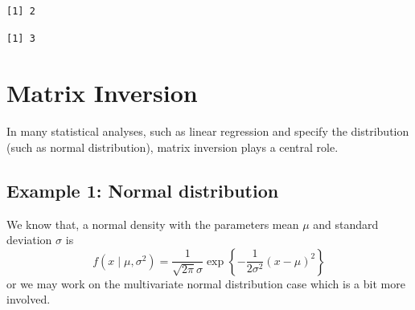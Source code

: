 \documentclass[
  letterpaper,
  DIV=11,
  numbers=noendperiod]{scrreprt}
\newenvironment{Shaded}{\begin{snugshade}}{\end{snugshade}}
\newcommand{\AttributeTok}[1]{\textcolor[rgb]{0.40,0.45,0.13}{#1}}
\newcommand{\ConstantTok}[1]{\textcolor[rgb]{0.56,0.35,0.01}{#1}}
\newcommand{\DecValTok}[1]{\textcolor[rgb]{0.68,0.00,0.00}{#1}}
\newcommand{\FloatTok}[1]{\textcolor[rgb]{0.68,0.00,0.00}{#1}}
\newcommand{\FunctionTok}[1]{\textcolor[rgb]{0.28,0.35,0.67}{#1}}
\newcommand{\NormalTok}[1]{\textcolor[rgb]{0.00,0.23,0.31}{#1}}
\newcommand{\OtherTok}[1]{\textcolor[rgb]{0.00,0.23,0.31}{#1}}
\newcommand{\SpecialCharTok}[1]{\textcolor[rgb]{0.37,0.37,0.37}{#1}}
\begin{document}
\begin{Shaded}
\end{Shaded}

\begin{verbatim}
[1] 2
\end{verbatim}

\begin{Shaded}
\end{Shaded}

\begin{verbatim}
[1] 3
\end{verbatim}

\section{Matrix Inversion}\label{matrix-inversion}

In many statistical analyses, such as linear regression and specify the
distribution (such as normal distribution), matrix inversion plays a
central role.

\subsection{Example 1: Normal
distribution}\label{example-1-normal-distribution}

We know that, a normal density with the parameters mean \(\mu\) and
standard deviation \(\sigma\) is \[
f\left(x \mid \mu, \sigma^2\right)=\frac{1}{\sqrt{2 \pi} \sigma} \exp\left\{-\frac{1}{2 \sigma^2}(x-\mu)^2\right\}
\] or we may work on the multivariate normal distribution case which is
a bit more involved.
\end{document}
